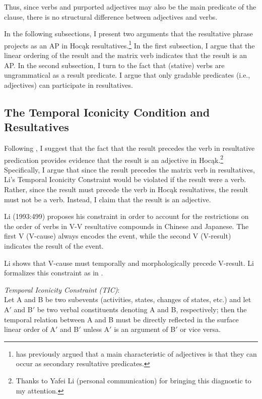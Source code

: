 \documentclass[output=paper]{LSP/langsci}
\begin{document}
Thus, since verbs and purported adjectives may also be the main predicate of the clause, there is no structural difference between adjectives and verbs.

In the following subsections, I present two arguments that the resultative phrase projects as an AP in Hocąk resultatives.\footnote{\citet{Baker2003} has previously argued that a main characteristic of adjectives is that they can occur as secondary resultative predicates.} In the first subsection, I argue that the linear ordering of the result and the matrix verb indicates that the result is an AP. In the second subsection, I turn to the fact that (stative) verbs are ungrammatical as a result predicate. I argue that only gradable predicates (i.e., adjectives) can participate in resultatives. 

\subsection{The Temporal Iconicity Condition and Resultatives}

Following \citet{Li1993}, I suggest that the fact that the result precedes the verb in resultative predication provides evidence that the result is an adjective in Hocąk.\footnote{Thanks to Yafei Li (personal communication) for bringing this diagnostic to my attention.} Specifically, I argue that since the result precedes the matrix verb in resultatives, Li's  Temporal Iconicity Constraint would be violated if the result were a verb. Rather, since the result must precede the verb in Hocąk resultatives, the result must not be a verb. Instead, I claim that the result is an adjective.

Li (1993:499) proposes his constraint in order to account for the restrictions on the order of verbs in V-V resultative compounds in Chinese and Japanese. The first V (V-cause) always encodes the event, while the second V (V-result) indicates the result of the event. 

Li shows that V-cause must temporally and morphologically precede V-result. Li formalizes this constraint as in .

\begin{exe}

\ex
 \emph{Temporal Iconicity Constraint (TIC)}:\\
 Let A and B be two subevents (activities, states, changes of states, etc.) and let A$'$ and B$'$ be two verbal constituents denoting A and B, respectively; then the temporal relation between A and B must be directly reflected in the surface linear order of A$'$ and B$'$ unless A$'$ is an argument of B$'$ or vice versa.
 
 \end{exe}
\end{document}
